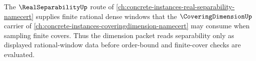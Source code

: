 The $\RealSeparabilityUp$ route of \autoref{ch:concrete-instances-real-separability-namecert} supplies finite rational dense windows that the $\CoveringDimensionUp$ carrier of \autoref{ch:concrete-instances-coveringdimension-namecert} may consume when sampling finite covers. Thus the dimension packet reads separability only as displayed rational-window data before order-bound and finite-cover checks are evaluated.
